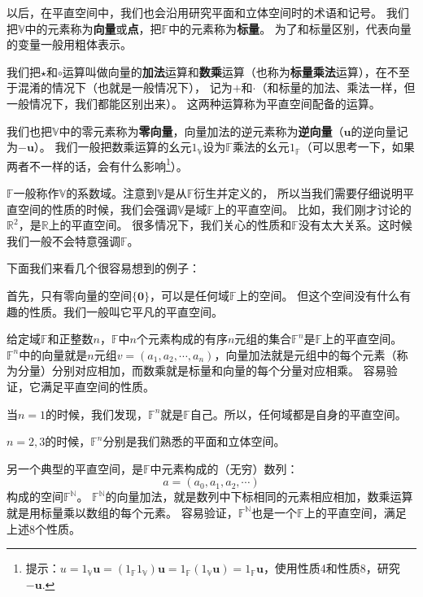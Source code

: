 \documentclass[12pt,UTF8,fontset=none]{ctexbook}
\begin{document}
以后，在平直空间中，我们也会沿用研究平面和立体空间时的术语和记号。
我们把$\mathbb{V}$中的元素称为\textbf{向量}或\textbf{点}，把$\mathbb{F}$中的元素称为\textbf{标量}。
为了和标量区别，代表向量的变量一般用粗体表示。

我们把$\star$和$\circ$运算叫做向量的\textbf{加法}运算和\textbf{数乘}运算（也称为\textbf{标量乘法}运算），在不至于混淆的情况下（也就是一般情况下），
记为$+$和$\cdot$（和标量的加法、乘法一样，但一般情况下，我们都能区别出来）。
这两种运算称为平直空间配备的运算。

我们也把$\mathbb{V}$中的零元素称为\textbf{零向量}，向量加法的逆元素称为\textbf{逆向量}（$\mathbf{u}$的逆向量记为$-\mathbf{u}$）。
我们一般把数乘运算的幺元$1_\mathbb{V}$设为$\mathbb{F}$乘法的幺元$1_\mathbb{F}$（可以思考一下，如果两者不一样的话，会有什么影响\footnote{提示：$u = 1_\mathbb{V}\mathbf{u} = (1_\mathbb{F}1_\mathbb{V})\mathbf{u} = 1_\mathbb{F}(1_\mathbb{V} \mathbf{u}) = 1_\mathbb{F}\mathbf{u}$，使用性质4和性质8，研究$-\mathbf{u}.$}）。

$\mathbb{F}$一般称作$\mathbb{V}$的系数域。注意到$\mathbb{V}$是从$\mathbb{F}$衍生并定义的，
所以当我们需要仔细说明平直空间的性质的时候，我们会强调$\mathbb{V}$是域$\mathbb{F}$上的平直空间。
比如，我们刚才讨论的$\mathbb{R}^2$，是$\mathbb{R}$上的平直空间。
很多情况下，我们关心的性质和$\mathbb{F}$没有太大关系。这时候我们一般不会特意强调$\mathbb{F}$。

下面我们来看几个很容易想到的例子：

首先，只有零向量的空间$\{\mathbf{0}\}$，可以是任何域$\mathbb{F}$上的空间。
但这个空间没有什么有趣的性质。我们一般叫它平凡的平直空间。

给定域$\mathbb{F}$和正整数$n$，$\mathbb{F}$中$n$个元素构成的有序$n$元组的集合$\mathbb{F}^n$是$\mathbb{F}$上的平直空间。
$\mathbb{F}^n$中的向量就是$n$元组$v = (a_1, a_2, \cdots, a_n)$，向量加法就是元组中的每个元素（称为分量）分别对应相加，而数乘就是标量和向量的每个分量对应相乘。
容易验证，它满足平直空间的性质。

当$n=1$的时候，我们发现，$\mathbb{F}^n$就是$\mathbb{F}$自己。所以，任何域都是自身的平直空间。

$n=2,3$的时候，$\mathbb{F}^n$分别是我们熟悉的平面和立体空间。

另一个典型的平直空间，是$\mathbb{F}$中元素构成的（无穷）数列：
$$ a = (a_0, a_1, a_2, \cdots ) $$
构成的空间$\mathbb{F}^\mathbb{N}$。
$\mathbb{F}^\mathbb{N}$的向量加法，就是数列中下标相同的元素相应相加，数乘运算就是用标量乘以数组的每个元素。
容易验证，$\mathbb{F}^\mathbb{N}$也是一个$\mathbb{F}$上的平直空间，满足上述8个性质。
\end{document}
